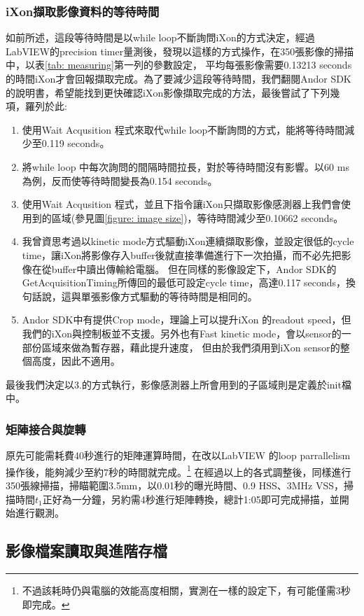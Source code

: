 \documentclass[12pt]{article}
\begin{document}
\subsubsection{iXon擷取影像資料的等待時間}
如前所述，這段等待時間是以while loop不斷詢問iXon的方式決定，經過LabVIEW的precision timer量測後，發現以這樣的方式操作，在350張影像的掃描中，以表\ref{tab: measuring}第一列的參數設定，
平均每張影像需要0.13213 seconds的時間iXon才會回報擷取完成。為了要減少這段等待時間，我們翻閱Andor SDK的說明書，希望能找到更快確認iXon影像擷取完成的方法，最後嘗試了下列幾項，羅列於此:
\begin{enumerate}
    \item 使用Wait Acqusition 程式來取代while loop不斷詢問的方式，能將等待時間減少至0.119 seconds。
    \item 將while loop 中每次詢問的間隔時間拉長，對於等待時間沒有影響。以60 ms為例，反而使等待時間變長為0.154 seconds。
    \item 使用Wait Acqusition 程式，並且下指令讓iXon只擷取影像感測器上我們會使用到的區域(參見圖\ref{figure: image size})，等待時間減少至0.10662 seconds。
    \item 我曾資思考過以kinetic mode方式驅動iXon連續擷取影像，並設定很低的cycle time，讓iXon將影像存入buffer後就直接準備進行下一次拍攝，而不必先把影像在從buffer中讀出傳輸給電腦。
          但在同樣的影像設定下，Andor SDK的GetAcquisitionTiming所傳回的最低可設定cycle time，高達0.117 seconds，換句話說，這與單張影像方式驅動的等待時間是相同的。
    \item Andor SDK中有提供Crop mode，理論上可以提升iXon 的readout speed，但我們的iXon與控制板並不支援。另外也有Fast kinetic mode，會以sensor的一部份區域來做為暫存器，藉此提升速度，
          但由於我們須用到iXon sensor的整個高度，因此不適用。
\end{enumerate}
最後我們決定以3.的方式執行，影像感測器上所會用到的子區域則是定義於init檔中。
\subsubsection{矩陣接合與旋轉}
原先可能需耗費40秒進行的矩陣運算時間，在改以LabVIEW 的loop parrallelism操作後，能夠減少至約7秒的時間就完成。\footnote{不過該耗時仍與電腦的效能高度相關，實測在一樣的設定下，有可能僅需3秒即完成。}
在經過以上的各式調整後，同樣進行350張線掃描，掃瞄範圍3.5mm，以0.01秒的曝光時間、0.9 HSS、3MHz VSS，掃描時間$t_1$正好為一分鐘，另約需4秒進行矩陣轉換，總計1:05即可完成掃描，並開始進行觀測。



\subsection{影像檔案讀取與進階存檔}
\end{document}
